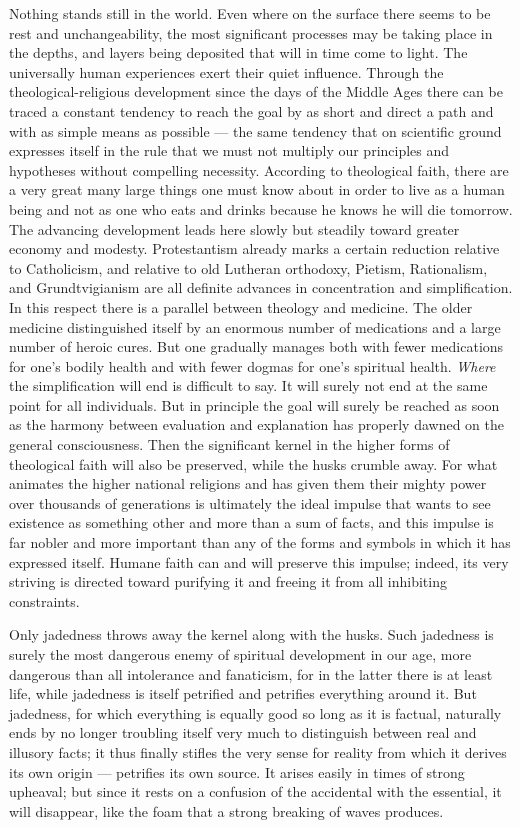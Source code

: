 \documentclass[12pt,a4paper,openany]{book}
\newcommand{\opage}[1]{\marginnote{\footnotesize\textit{[#1]}}}
\begin{document}
Nothing stands still in the world. Even where on the surface there seems to be rest and unchangeability, the most significant processes may be taking place in the depths, and layers being deposited that will in time come to light. The universally human experiences exert their quiet influence. Through the theological-religious development since the days of the Middle Ages there can be traced a constant tendency to reach the goal by as short and direct a path and with as simple means as possible --- the same tendency that on scientific ground expresses itself in the rule that we must not multiply our principles and hypotheses without compelling necessity. According to theological faith, there are a very great many large things one must know about in order to live as a human being and not as one who eats and drinks because he knows he will die tomorrow. The advancing development leads here slowly but steadily toward greater economy and modesty. Protestantism already marks a certain reduction relative to Catholicism, and relative to old Lutheran orthodoxy, Pietism, Rationalism, and Grundtvigianism are all definite advances in concentration and simplification. In this respect there is a parallel between theology and medicine. The older medicine distinguished itself by an enormous number of medications and a large number of heroic cures. But one gradually manages both with fewer medications for one's bodily health and with fewer dogmas for one's spiritual health. \emph{Where} the simplification will end is difficult to say. It will surely not end at the same point for all individuals. But in principle the goal will surely be reached as soon as the harmony between evaluation and explanation has properly dawned on the general consciousness. Then the significant kernel in the higher forms of theological faith will also be preserved,
\opage{14}while the husks crumble away. For what animates the higher national religions and has given them their mighty power over thousands of generations is ultimately the ideal impulse that wants to see existence as something other and more than a sum of facts, and this impulse is far nobler and more important than any of the forms and symbols in which it has expressed itself. Humane faith can and will preserve this impulse; indeed, its very striving is directed toward purifying it and freeing it from all inhibiting constraints.

Only jadedness throws away the kernel along with the husks. Such jadedness is surely the most dangerous enemy of spiritual development in our age, more dangerous than all intolerance and fanaticism, for in the latter there is at least life, while jadedness is itself petrified and petrifies everything around it. But jadedness, for which everything is equally good so long as it is factual, naturally ends by no longer troubling itself very much to distinguish between real and illusory facts; it thus finally stifles the very sense for reality from which it derives its own origin --- petrifies its own source. It arises easily in times of strong upheaval; but since it rests on a confusion of the accidental with the essential, it will disappear, like the foam that a strong breaking of waves produces.
\end{document}
